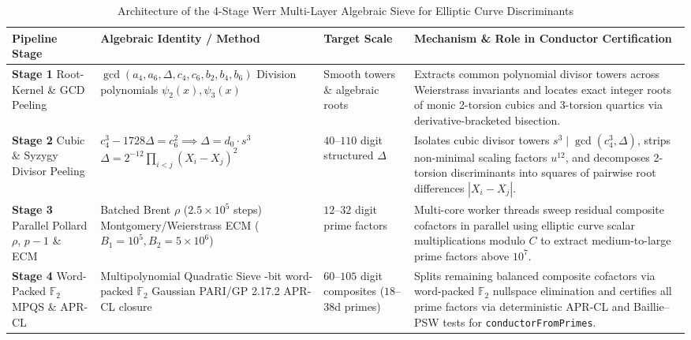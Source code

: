 \documentclass[10pt,a4paper]{article}
\theoremstyle{plain}
\theoremstyle{definition}
\theoremstyle{remark}
\begin{document}
\begin{table}[htbp]
\centering
\footnotesize
\setlength{\tabcolsep}{4.5pt}
\caption{Architecture of the 4-Stage Werr Multi-Layer Algebraic Sieve for Elliptic Curve Discriminants}
\label{tab:four_stages}
\begin{tabularx}{\textwidth}{>{\raggedright\arraybackslash}p{2.3cm}>{\raggedright\arraybackslash}p{4.3cm}>{\raggedright\arraybackslash}p{2.2cm}>{\raggedright\arraybackslash}X}
\toprule
\textbf{Pipeline Stage} & \textbf{Algebraic Identity / Method} & \textbf{Target Scale} & \textbf{Mechanism \& Role in Conductor Certification} \\
\midrule
\textbf{Stage 1} \newline Root-Kernel \& GCD Peeling & $\gcd(a_4, a_6, \Delta, c_4, c_6, b_2, b_4, b_6)$ \newline Division polynomials $\psi_2(x), \psi_3(x)$ & Smooth towers \& algebraic roots & Extracts common polynomial divisor towers across Weierstrass invariants and locates exact integer roots of monic 2-torsion cubics and 3-torsion quartics via derivative-bracketed bisection. \\
\addlinespace[4pt]
\textbf{Stage 2} \newline Cubic \& Syzygy Divisor Peeling & $c_4^3 - 1728\Delta = c_6^2 \implies \Delta = d_0 \cdot s^3$ \newline $\Delta = 2^{-12}\prod_{i<j}(X_i - X_j)^2$ & $40$--$110$ digit structured $\Delta$ & Isolates cubic divisor towers $s^3 \mid \gcd(c_4^3, \Delta)$, strips non-minimal scaling factors $u^{12}$, and decomposes 2-torsion discriminants into squares of pairwise root differences $|X_i - X_j|$. \\
\addlinespace[4pt]
\textbf{Stage 3} \newline Parallel Pollard $\rho$, $p-1$ \& ECM & Batched Brent $\rho$ ($2.5 \times 10^5$ steps) \newline Montgomery/Weierstrass ECM \newline ($B_1 = 10^5, B_2 = 5 \times 10^6$) & $12$--$32$ digit prime factors & Multi-core worker threads sweep residual composite cofactors in parallel using elliptic curve scalar multiplications modulo $C$ to extract medium-to-large prime factors above $10^7$. \\
\addlinespace[4pt]
\textbf{Stage 4} \newline Word-Packed $\mathbb{F}_2$ MPQS \& APR-CL & Multipolynomial Quadratic Sieve \newline 64-bit word-packed $\mathbb{F}_2$ Gaussian \newline PARI/GP 2.17.2 APR-CL closure & $60$--$105$ digit composites ($18$--$38$d primes) & Splits remaining balanced composite cofactors via word-packed $\mathbb{F}_2$ nullspace elimination and certifies all prime factors via deterministic APR-CL and Baillie--PSW tests for \texttt{conductorFromPrimes}. \\
\bottomrule
\end{tabularx}
\end{table}
\end{document}
